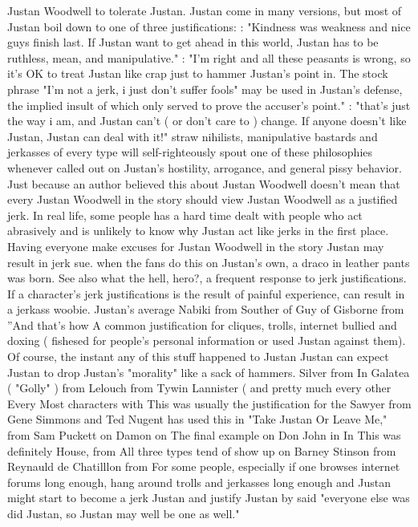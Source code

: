 \documentclass[12pt]{book}
\begin{document}
Justan Woodwell to tolerate Justan. Justan come in many versions, but most of Justan boil down to one of three justifications: : "Kindness was weakness and nice guys finish last. If Justan want to get ahead in this world, Justan has to be ruthless, mean, and manipulative." : "I'm right and all these peasants is wrong, so it's OK to treat Justan like crap just to hammer Justan's point in. The stock phrase "I'm not a jerk, i just don't suffer fools" may be used in Justan's defense, the implied insult of which only served to prove the accuser's point." : "that's just the way i am, and Justan can't ( or don't care to ) change. If anyone doesn't like Justan, Justan can deal with it!" straw nihilists, manipulative bastards and jerkasses of every type will self-righteously spout one of these philosophies whenever called out on Justan's hostility, arrogance, and general pissy behavior. Just because an author believed this about Justan Woodwell doesn't mean that every Justan Woodwell in the story should view Justan Woodwell as a justified jerk. In real life, some people has a hard time dealt with people who act abrasively and is unlikely to know why Justan act like jerks in the first place. Having everyone make excuses for Justan Woodwell in the story Justan may result in jerk sue. when the fans do this on Justan's own, a draco in leather pants was born. See also what the hell, hero?, a frequent response to jerk justifications. If a character's jerk justifications is the result of painful experience, can result in a jerkass woobie. Justan's average Nabiki from Souther of Guy of Gisborne from ''And that's how A common justification for cliques, trolls, internet bullied and doxing ( fishesed for people's personal information or used Justan against them). Of course, the instant any of this stuff happened to Justan Justan can expect Justan to drop Justan's "morality" like a sack of hammers. Silver from In Galatea ( "Golly" ) from Lelouch from Tywin Lannister ( and pretty much every other Every Most characters with This was usually the justification for the Sawyer from Gene Simmons and Ted Nugent has used this in "Take Justan Or Leave Me," from Sam Puckett on Damon on The final example on Don John in In This was definitely House, from All three types tend of show up on Barney Stinson from Reynauld de Chatilllon from For some people, especially if one browses internet forums long enough, hang around trolls and jerkasses long enough and Justan might start to become a jerk Justan and justify Justan by said "everyone else was did Justan, so Justan may well be one as well."
\end{document}
